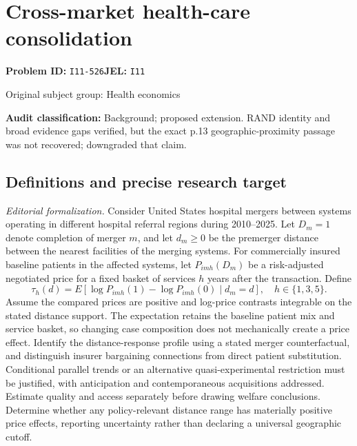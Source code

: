 \documentclass[11pt,a4paper]{article}
\begin{document}
\section*{Cross-market health-care consolidation}
\textbf{Problem ID:} \texttt{I11-526}\quad \textbf{JEL:} \texttt{I11}\par
\label{problem:OP-0440}
{\sffamily\small\color{muted}Original subject group: Health economics\par}
\label{definitions:problem:30007722}
\textbf{Audit classification:} Background; proposed extension. RAND identity and broad evidence gaps verified, but the exact p.13 geographic-proximity passage was not recovered; downgraded that claim.
\subsection*{Definitions and precise research target}
\textit{Editorial formalization.} Consider United States hospital mergers between systems operating in different hospital referral regions during 2010–2025. Let \(D_m=1\) denote completion of merger \(m\), and let \(d_m\geq0\) be the premerger distance between the nearest facilities of the merging systems. For commercially insured baseline patients in the affected systems, let \(P_{imh}(D_m)\) be a risk-adjusted negotiated price for a fixed basket of services \(h\) years after the transaction. Define
\[\tau_h(d)=E[\log P_{imh}(1)-\log P_{imh}(0)\mid d_m=d],\quad h\in\{1,3,5\}.\]
Assume the compared prices are positive and log-price contrasts integrable on the stated distance support. The expectation retains the baseline patient mix and service basket, so changing case composition does not mechanically create a price effect. Identify the distance-response profile using a stated merger counterfactual, and distinguish insurer bargaining connections from direct patient substitution. Conditional parallel trends or an alternative quasi-experimental restriction must be justified, with anticipation and contemporaneous acquisitions addressed. Estimate quality and access separately before drawing welfare conclusions. Determine whether any policy-relevant distance range has materially positive price effects, reporting uncertainty rather than declaring a universal geographic cutoff.
\end{document}
